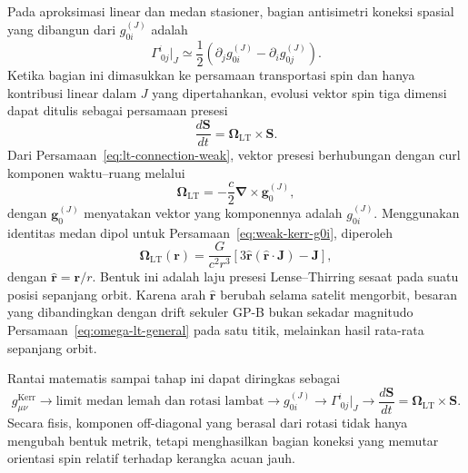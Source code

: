 Pada aproksimasi linear dan medan stasioner, bagian antisimetri koneksi
spasial yang dibangun dari $g_{0i}^{(J)}$ adalah
\begin{equation}
    \Gamma^i_{\ 0j}\big|_{J}
    \simeq
    \frac{1}{2}
    \left(
        \partial_j g_{0i}^{(J)}
        -\partial_i g_{0j}^{(J)}
    \right).
    \label{eq:lt-connection-weak}
\end{equation}
Ketika bagian ini dimasukkan ke persamaan transportasi spin dan hanya
kontribusi linear dalam $J$ yang dipertahankan, evolusi vektor spin tiga
dimensi dapat ditulis sebagai persamaan presesi
\begin{equation}
    \frac{d\mathbf{S}}{dt}
    =\bm{\Omega}_{\mathrm{LT}}\times\mathbf{S}.
    \label{eq:lt-spin-precession-form}
\end{equation}
Dari Persamaan~\eqref{eq:lt-connection-weak}, vektor presesi berhubungan
dengan curl komponen waktu--ruang melalui
\begin{equation}
    \bm{\Omega}_{\mathrm{LT}}
    =-\frac{c}{2}\bm{\nabla}\times\mathbf{g}_0^{(J)},
    \label{eq:lt-curl-relation}
\end{equation}
dengan $\mathbf{g}_0^{(J)}$ menyatakan vektor yang komponennya adalah
$g_{0i}^{(J)}$. Menggunakan identitas medan dipol untuk
Persamaan~\eqref{eq:weak-kerr-g0i}, diperoleh
\parencite{Lense1918LenseThirring,Will2014Confrontation}
\begin{equation}
    \bm{\Omega}_{\mathrm{LT}}(\mathbf{r})
    =\frac{G}{c^2r^3}
    \left[
        3\hat{\mathbf{r}}
        \left(\hat{\mathbf{r}}\cdot\mathbf{J}\right)
        -\mathbf{J}
    \right],
    \label{eq:omega-lt-general}
\end{equation}
dengan $\hat{\mathbf{r}}=\mathbf{r}/r$. Bentuk ini adalah laju presesi
Lense--Thirring sesaat pada suatu posisi sepanjang orbit. Karena arah
$\hat{\mathbf{r}}$ berubah selama satelit mengorbit, besaran yang dibandingkan
dengan drift sekuler GP-B bukan sekadar magnitudo Persamaan~\eqref{eq:omega-lt-general}
pada satu titik, melainkan hasil rata-rata sepanjang orbit.

Rantai matematis sampai tahap ini dapat diringkas sebagai
\begin{equation}
    g_{\mu\nu}^{\mathrm{Kerr}}
    \longrightarrow
    \text{limit medan lemah dan rotasi lambat}
    \longrightarrow
    g_{0i}^{(J)}
    \longrightarrow
    \Gamma^i_{\ 0j}\big|_J
    \longrightarrow
    \frac{d\mathbf{S}}{dt}
    =\bm{\Omega}_{\mathrm{LT}}\times\mathbf{S}.
    \label{eq:lt-weak-chain}
\end{equation}
Secara fisis, komponen off-diagonal yang berasal dari rotasi tidak hanya
mengubah bentuk metrik, tetapi menghasilkan bagian koneksi yang memutar
orientasi spin relatif terhadap kerangka acuan jauh.

